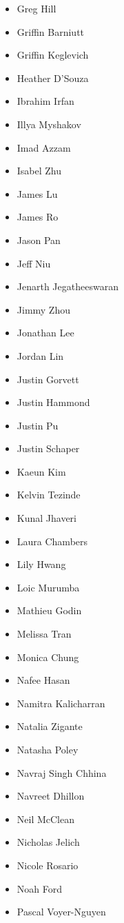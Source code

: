 \documentclass[main.tex]{subfiles}
\begin{document}
\begin{multicols}{3}
\begin{itemize}[label={},noitemsep]
     \item {Greg Hill}
	 \item {Griffin Barniutt}
     \item {Griffin Keglevich}
	 \item {Heather D'Souza}
     \item {Ibrahim Irfan}
     \item {Illya Myshakov}
	 \item {Imad Azzam}
     \item {Isabel Zhu}
	 \item {James Lu}
     \item {James Ro}
	 \item {Jason Pan}
     \item {Jeff Niu}
	 \item {Jenarth Jegatheeswaran}
     \item {Jimmy Zhou}
	 \item {Jonathan Lee}
     \item {Jordan Lin}
	 \item {Justin Gorvett}
     \item {Justin Hammond}
	 \item {Justin Pu}
     \item {Justin Schaper}
	 \item {Kaeun Kim}
     \item {Kelvin Tezinde}
	 \item {Kunal Jhaveri}
	 \item {Laura Chambers}
     \item {Lily Hwang}
	 \item {Loic Murumba}
     \item {Mathieu Godin}
	 \item {Melissa Tran}
     \item {Monica Chung}
	 \item {Nafee Hasan}
     \item {Namitra Kalicharran}
	 \item {Natalia Zigante}
     \item {Natasha Poley}
	 \item {Navraj Singh Chhina}
     \item {Navreet Dhillon}
	 \item {Neil McClean}
     \item {Nicholas Jelich}
	 \item {Nicole Rosario}
     \item {Noah Ford}
	 \item {Pascal Voyer-Nguyen}

\end{itemize}
\end{multicols}
\end{document}
